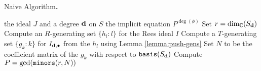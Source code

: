 \documentclass[fleqn,reqno]{amsart}
\numberwithin{first}{chapter}
\begin{document}
\begin{absolutelynopagebreak}
\begin{algorithm} {\sc Naive Algorithm\bf.}
\label{algo:naive}
\begin{algorithmic}
   the ideal $J$ and a degree $\mathbf d$ on $S$
   the implicit equation $P^{\deg(\phi)}$
  \State Set $r=\dim_{\mathbb{C}}(S_{\mathbf d})$
  \State Compute an $R$-generating set $\{h_l:l\}$ for the Rees ideal $I$
  \State Compute a $T$-generating set $\{g_k:k\}$ for $I_{\mathbf d,\bullet}$ from the $h_l$
  	using Lemma \ref{lemma:push-gens}
  \State Set $N$ to be the coefficient matrix of the $g_k$ with respect to $\mathop{\tt basis}(S_\mathbf d)$
  \State Compute $P=\gcd(\mathop{\tt minors}(r,N))$
\end{algorithmic}
\end{algorithm}
\end{absolutelynopagebreak}
\end{document}
